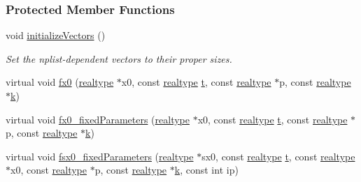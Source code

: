 \subsubsection*{Protected Member Functions}
\begin{DoxyCompactItemize}
\item 
\mbox{\label{classamici_1_1_model_a01b01e15d5cac9cec911a30f65e327f8}} 
void \mbox{\hyperlink{classamici_1_1_model_a01b01e15d5cac9cec911a30f65e327f8}{initialize\+Vectors}} ()
\begin{DoxyCompactList}\small\item\em Set the nplist-\/dependent vectors to their proper sizes. \end{DoxyCompactList}\item 
virtual void \mbox{\hyperlink{classamici_1_1_model_a7308da7a08d01470e621571412902947}{fx0}} (\mbox{\hyperlink{namespaceamici_a1bdce28051d6a53868f7ccbf5f2c14a3}{realtype}} $\ast$x0, const \mbox{\hyperlink{namespaceamici_a1bdce28051d6a53868f7ccbf5f2c14a3}{realtype}} \mbox{\hyperlink{classamici_1_1_model_a711281d57e9710226face29151cc4641}{t}}, const \mbox{\hyperlink{namespaceamici_a1bdce28051d6a53868f7ccbf5f2c14a3}{realtype}} $\ast$p, const \mbox{\hyperlink{namespaceamici_a1bdce28051d6a53868f7ccbf5f2c14a3}{realtype}} $\ast$\mbox{\hyperlink{classamici_1_1_model_adde50e0d8a99d20354c8403bf93fab6f}{k}})
\item 
virtual void \mbox{\hyperlink{classamici_1_1_model_a0658471c5f4714bae3811ec99bb0555b}{fx0\+\_\+fixed\+Parameters}} (\mbox{\hyperlink{namespaceamici_a1bdce28051d6a53868f7ccbf5f2c14a3}{realtype}} $\ast$x0, const \mbox{\hyperlink{namespaceamici_a1bdce28051d6a53868f7ccbf5f2c14a3}{realtype}} \mbox{\hyperlink{classamici_1_1_model_a711281d57e9710226face29151cc4641}{t}}, const \mbox{\hyperlink{namespaceamici_a1bdce28051d6a53868f7ccbf5f2c14a3}{realtype}} $\ast$p, const \mbox{\hyperlink{namespaceamici_a1bdce28051d6a53868f7ccbf5f2c14a3}{realtype}} $\ast$\mbox{\hyperlink{classamici_1_1_model_adde50e0d8a99d20354c8403bf93fab6f}{k}})
\item 
virtual void \mbox{\hyperlink{classamici_1_1_model_a632916d9e0e794f69c8f1998ee3f3a38}{fsx0\+\_\+fixed\+Parameters}} (\mbox{\hyperlink{namespaceamici_a1bdce28051d6a53868f7ccbf5f2c14a3}{realtype}} $\ast$sx0, const \mbox{\hyperlink{namespaceamici_a1bdce28051d6a53868f7ccbf5f2c14a3}{realtype}} \mbox{\hyperlink{classamici_1_1_model_a711281d57e9710226face29151cc4641}{t}}, const \mbox{\hyperlink{namespaceamici_a1bdce28051d6a53868f7ccbf5f2c14a3}{realtype}} $\ast$x0, const \mbox{\hyperlink{namespaceamici_a1bdce28051d6a53868f7ccbf5f2c14a3}{realtype}} $\ast$p, const \mbox{\hyperlink{namespaceamici_a1bdce28051d6a53868f7ccbf5f2c14a3}{realtype}} $\ast$\mbox{\hyperlink{classamici_1_1_model_adde50e0d8a99d20354c8403bf93fab6f}{k}}, const int ip)

\end{DoxyCompactItemize}
